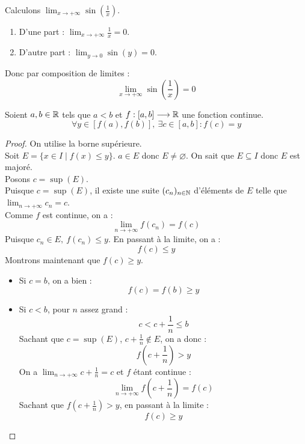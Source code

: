 \begin{example}
	Calculons $\lim_{x \to +\infty} \sin \left( \frac{1}{x} \right)$.
	\begin{enumerate}
		\item D'une part : $\lim_{x \to +\infty} \frac{1}{x} = 0$.
		\item D'autre part : $\lim_{y \to 0} \sin(y) = 0$.
	\end{enumerate}
	Donc par composition de limites : 
	\[ \lim_{x \to +\infty} \sin \left( \frac{1}{x} \right) = 0 \]
\end{example}

\begin{theorem}
	Soient $a, b \in \mathbb{R}$ tels que $a < b$ et $f : [a, b] \longrightarrow \mathbb{R}$ une fonction continue.
	\[ \forall y \in [f(a), f(b)],\ \exists c \in [a, b] : f(c) = y \]
\end{theorem}

\begin{proof}
	On utilise la borne supérieure.
	\\
	Soit $E = \{ x \in I \mid f(x) \leq y \}$. $a \in E$ donc $E \neq \varnothing$. On sait que $E \subseteq I$ donc $E$ est majoré.
	\\
	Posons $c = \sup(E)$.
	\\
	Puisque $c = \sup(E)$, il existe une suite $(c_n)_{n \in \mathbb{N}}$ d'éléments de $E$ telle que $\lim_{n \to +\infty} c_n = c$. 
	\\
	Comme $f$ est continue, on a :
	\[ \lim_{n \to +\infty} f(c_n) = f(c) \] 
	Puisque $c_n \in E,\ f(c_n) \leq y$. En passant à la limite, on a :
	\[ f(c) \leq y \]
	Montrons maintenant que $f(c) \geq y$.
	\begin{itemize}
		\item Si $c = b$, on a bien :
		\[ f(c) = f(b)  \geq y \]
		\item Si $c < b$, pour $n$ assez grand :
		\[ c < c + \frac{1}{n} \leq b \]
		Sachant que $c = \sup(E)$, $c + \frac{1}{n} \notin E$, on a donc :
		\[ f \left( c + \frac{1}{n} \right) > y \]
		On a $\lim_{n \to +\infty} c + \frac{1}{n} = c$ et $f$ étant continue :
		\[ \lim_{n \to +\infty} f \left( c + \frac{1}{n} \right) = f(c) \]
		Sachant que $f \left( c + \frac{1}{n} \right) > y$, en passant à la limite :
		\[ f(c) \geq y \]
	\end{itemize}
\end{proof}

